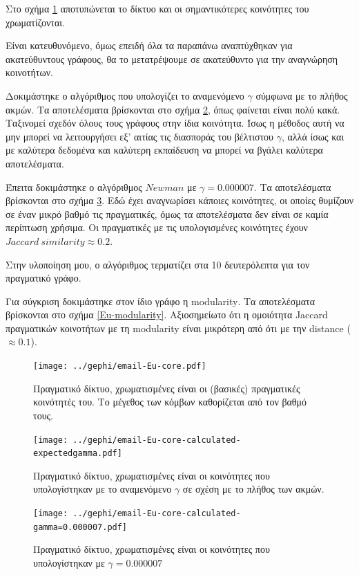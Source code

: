 \documentclass[12pt, letterpaper]{article}
\begin{document}
Στο σχήμα \ref{Eu-real} αποτυπώνεται το δίκτυο και οι σημαντικότερες κοινότητες του 
χρωματίζονται.


Είναι κατευθυνόμενο, όμως επειδή όλα τα παραπάνω αναπτύχθηκαν για ακατεύθυντους γράφους,
θα το μετατρέψουμε σε ακατεύθυντο για την αναγνώρηση κοινοτήτων.


Δοκιμάστηκε ο αλγόριθμος που υπολογίζει το αναμενόμενο $\gamma$ σύμφωνα με το πλήθος 
ακμών. Τα αποτελέσματα βρίσκονται στο σχήμα \ref{Eu-expected}, όπως φαίνεται είναι πολύ κακά.
Ταξινομεί σχεδόν όλους τους γράφους στην ίδια κοινότητα.
Ίσως η μέθοδος αυτή να μην μπορεί να λειτουργήσει εξ' αιτίας τις διασποράς του βέλτιστου 
$\gamma$, αλλά ίσως και με καλύτερα δεδομένα και καλύτερη εκπαίδευση να μπορεί να βγάλει καλύτερα
αποτελέσματα.


Έπειτα δοκιμάστηκε ο αλγόριθμος $Newman$ με $\gamma = 0.000007$. Τα αποτελέσματα βρίσκονται 
στο σχήμα \ref{Eu-gamma}. Εδώ έχει αναγνωρίσει κάποιες κοινότητες, οι οποίες θυμίζουν σε έναν 
μικρό βαθμό τις πραγματικές, όμως τα αποτελέσματα δεν είναι σε καμία περίπτωση 
χρήσιμα. Οι πραγματικές με τις υπολογισμένες κοινότητες έχουν $Jaccard \ similarity \approx 0.2$.

Στην υλοποίηση μου, ο αλγόριθμος τερματίζει στα 10 δευτερόλεπτα για τον πραγματικό γράφο.

Για σύγκριση δοκιμάστηκε στον ίδιο γράφο η \textlatin{modularity}. Τα αποτελέσματα βρίσκονται στο σχήμα 
\ref{Eu-modularity}.
Αξιοσημείωτο ότι η ομοιότητα \textlatin{Jaccard} πραγματικών κοινοτήτων με τη \textlatin{modularity} είναι μικρότερη 
από ότι με την \textlatin{distance} ($\approx 0.1$). 






\begin{figure}
  \centering
  \texttt{[image: ../gephi/email-Eu-core.pdf]}
  \caption{Πραγματικό δίκτυο, χρωματισμένες είναι οι (βασικές) πραγματικές κοινότητές του.
  Το μέγεθος των κόμβων καθορίζεται από τον βαθμό τους.}
  \label{Eu-real}
\end{figure}


\begin{figure}
  \centering
  \texttt{[image: ../gephi/email-Eu-core-calculated-expectedgamma.pdf]}
  \caption{Πραγματικό δίκτυο, χρωματισμένες είναι οι κοινότητες που υπολογίστηκαν με το 
  αναμενόμενο $\gamma$ σε σχέση με το πλήθος των ακμών.}
  \label{Eu-expected}
\end{figure}

\begin{figure}
  \centering
  \texttt{[image: ../gephi/email-Eu-core-calculated-gamma=0.000007.pdf]}
  \caption{Πραγματικό δίκτυο, χρωματισμένες είναι οι κοινότητες που υπολογίστηκαν με $\gamma = 0.000007$}
  \label{Eu-gamma}
\end{figure}
\end{document}
